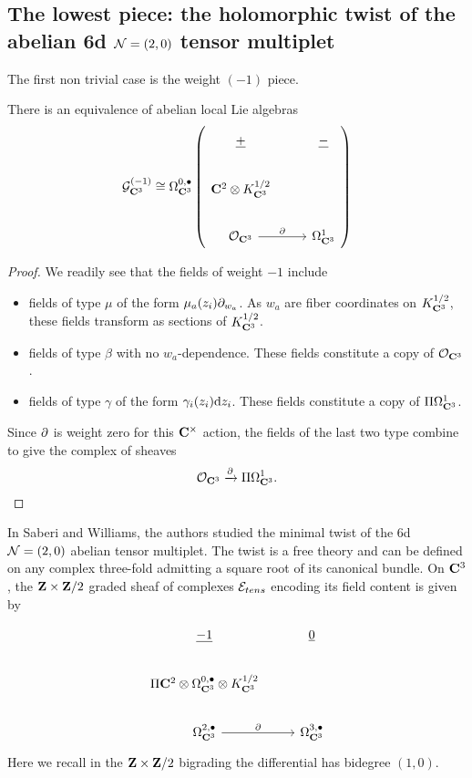 \documentclass[../main.tex]{subfiles}
\begin{document}
\subsection{The lowest piece: the holomorphic twist of the abelian 6d $\mathcal{N}=(2,0)$ tensor multiplet}\label{subsec:g-1}

The first non trivial case is the weight $(-1)$ piece.

\begin{lem}
There is an equivalence of abelian local Lie algebras 
\[
\mc{G}_{\C^3} ^{(-1)}\cong \Omega^{0,\bullet}_{\C^3} \left ( 
\begin{tikzcd}
\ul{+} & \ul{-} \\
\C^2\otimes K^{1/2}_{\C^3} & \\ 
\mc{O}_{\C^3} \ar[r, "\del"] & \Omega^1_{\C^3} 
\end{tikzcd}
\right )
\] 
\end{lem}
\begin{proof}
We readily see that the fields of weight $-1$ include
\begin{itemize}
\item 
fields of type $\mu$ of the form $\mu_a (z_i)\partial_{w_a}$. As $w_a$ are fiber coordinates on $K^{1/2}_{\mathbf{C}^3}$, these fields transform as sections of $K^{1/2}_{\mathbf{C}^3}$. 
\item 
fields of type $\beta$ with no $w_a$-dependence. These fields constitute a copy of $\mathcal{O}_{\mathbf{C}^3}$.
\item 
fields of type $\gamma$ of the form $\gamma_i(z_i)\mathrm{d} z_i$. These fields constitute a copy of $\Pi \Omega^1_{\mathbf{C}^3}$. 
\end{itemize}
Since $\partial$ is weight zero for this $\mathbf{C}^\times$ action, the fields of the last two type combine to give the complex of sheaves
\[
\mathcal{O}_{\mathbf{C}^3}  \xrightarrow{\partial} \Pi \Omega^{1}_{\mathbf{C}^3}  .
\]

\end{proof}

\parsec[]
In \cite{SWtensor} Saberi and Williams, the authors studied the minimal twist of the 6d $\mathcal{N}=(2,0)$ abelian tensor multiplet. The twist is a free theory and can be defined on any complex three-fold admitting a square root of its canonical bundle. On $\mathbf{C}^3$, the $\mathbf{Z}\times \mathbf{Z}/2$ graded sheaf of complexes $\mathcal{E}_{tens}$ encoding its field content is given by 

\begin{equation}
\begin{tikzcd}
\ul{-1} & \ul{0} \\
\Pi \C^2\otimes \Omega^{0,\bullet}_{\C^3} \otimes  K_{\C^3}^{1/2}  & \\
\Omega^{2,\bullet}_{\C^3} \ar[r,"\del"] & \Omega^{3,\bullet}_{\C^3} 
\end{tikzcd} 
\end{equation}
Here we recall in the $\mathbf{Z} \times \mathbf{Z}/2$ bigrading the differential has bidegree $(1,0)$. 
\end{document}
